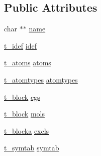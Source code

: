 \subsection*{\-Public \-Attributes}
\begin{DoxyCompactItemize}
\item 
char $\ast$$\ast$ \hyperlink{structt__topology_aa6d824e6a3b3b65de4662eca20785752}{name}
\item 
\hyperlink{structt__idef}{t\-\_\-idef} \hyperlink{structt__topology_a3e64be755402f5e7f1db6de15ab1555a}{idef}
\item 
\hyperlink{structt__atoms}{t\-\_\-atoms} \hyperlink{structt__topology_a376c1563a76aeb4fb3452a1465cd191a}{atoms}
\item 
\hyperlink{structt__atomtypes}{t\-\_\-atomtypes} \hyperlink{structt__topology_a5dfd8db276bf3218b8224cf62febd7d5}{atomtypes}
\item 
\hyperlink{structt__block}{t\-\_\-block} \hyperlink{structt__topology_a284bc1dc654ccd4c754105c1027b8c3f}{cgs}
\item 
\hyperlink{structt__block}{t\-\_\-block} \hyperlink{structt__topology_a4b373c94708f6e2f7c1e9f24babf191c}{mols}
\item 
\hyperlink{structt__blocka}{t\-\_\-blocka} \hyperlink{structt__topology_a1ed3794ea0cd8d10ebfef698398c5d02}{excls}
\item 
\hyperlink{structt__symtab}{t\-\_\-symtab} \hyperlink{structt__topology_a54de39b6fe9274042a56db0cfd07b6b0}{symtab}
\end{DoxyCompactItemize}


